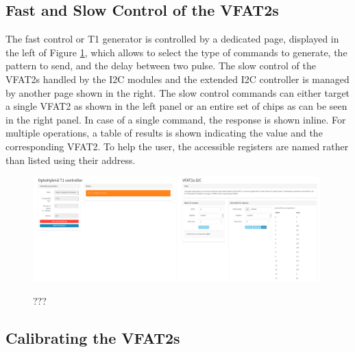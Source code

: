    \subsection{Fast and Slow Control of the VFAT2s}

      The fast control or T1 generator is controlled by a dedicated page, displayed in the left of Figure \ref{fig:II-3-app-control}, which allows to select the type of commands to generate, the pattern to send, and the delay between two pulse. The slow control of the VFAT2s handled by the I2C modules and the extended I2C controller is managed by another page shown in the right. The slow control commands can either target a single VFAT2 as shown in the left panel or an entire set of chips as can be seen in the right panel. In case of a single command, the response is shown inline. For multiple operations, a table of results is shown indicating the value and the corresponding VFAT2. To help the user, the accessible registers are named rather than listed using their address.

      \begin{figure}[h!]
        \centering
        \includegraphics[width=0.49\textwidth]{img/II-3-test-beam/app-t1.png}
        \includegraphics[width=0.49\textwidth]{img/II-3-test-beam/app-i2c.png}
        \caption{???}
        \label{fig:II-3-app-control}
      \end{figure}

    \subsection{Calibrating the VFAT2s}

